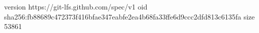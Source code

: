 version https://git-lfs.github.com/spec/v1
oid sha256:fb88689c472373f416bfae347eabfe2ea4b68fa33ffe6d9ccc2dfd813c6135fa
size 53861
